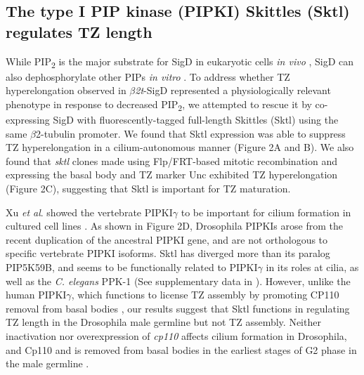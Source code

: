 \documentclass[12pt, twoside, letterpaper]{article}
\newcommand{\PIP}{PIP\textsubscript{2}}
\newcommand{\sigd}{$\beta$\textit{2t}-SigD}
\begin{document}
\begin{doublespacing}
\begin{linenumbers}
    \subsection{The type I PIP kinase (PIPKI) Skittles (Sktl) regulates TZ length}
    While \PIP{} is the major substrate for SigD in eukaryotic cells \textit{in vivo}
    \citep{terebiznik2002elimination, zhou2001salmonella, sengupta2013depletion},
    SigD can also dephosphorylate other PIPs \textit{in vitro}
    \citep{norris1998sopb}.
    To address whether TZ hyperelongation observed in \sigd{} represented a
    physiologically relevant phenotype in response to decreased \PIP{},
    we attempted to rescue it by
    co-expressing SigD with
    fluorescently-tagged full-length Skittles (Sktl)
    using the same $\beta$2-tubulin promoter.
    We found that Sktl expression was able to suppress TZ hyperelongation
    in a cilium-autonomous manner (Figure 2A and B).
    We also found that \textit{sktl} clones made
    using Flp/FRT-based mitotic recombination and expressing the
    basal body and TZ marker Unc
    \citep{baker2004mechanosensory, wei2008depletion}
    exhibited TZ hyperelongation (Figure 2C),
    suggesting that Sktl is important for TZ maturation.

    Xu \textit{et al}. showed the vertebrate PIPKI$\gamma$ to be
    important for cilium formation in cultured cell lines
    \citep{xu2014pipkigamma}.
    As shown in Figure 2D, Drosophila PIPKIs arose from the recent duplication of
    the ancestral PIPKI gene,
    and are not orthologous to specific vertebrate PIPKI isoforms.
    Sktl has diverged more than its paralog PIP5K59B, and seems
    to be functionally related to PIPKI$\gamma$ in its roles at cilia,
    as well as the \textit{C. elegans} PPK-1 (See supplementary data in \citep{xu2014pipkigamma}).
    However, unlike the human PIPKI$\gamma$, which functions to license TZ assembly
    by promoting CP110 removal from basal bodies \citep{xu2016phosphatidylinositol},
    our results suggest that Sktl functions in
    regulating TZ length in the Drosophila male germline
    but not TZ assembly.
    Neither inactivation nor overexpression of \textit{cp110} affects
    cilium formation in Drosophila, and Cp110
    and is removed from basal bodies in the earliest stages of G2 phase in the male germline
    \citep{franz2013cp110}.
    

\end{linenumbers}
\end{doublespacing}
\end{document}
